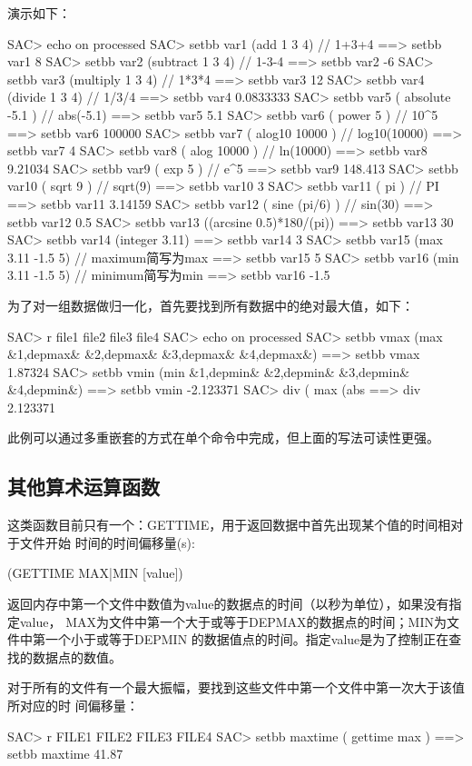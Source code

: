 演示如下：
\begin{SACCode}
SAC> echo on processed
SAC> setbb var1 (add 1 3 4)         // 1+3+4
 ==>  setbb var1 8
SAC> setbb var2 (subtract 1 3 4)    // 1-3-4
 ==>  setbb var2 -6
SAC> setbb var3 (multiply 1 3 4)    // 1*3*4
 ==>  setbb var3 12
SAC> setbb var4 (divide 1 3 4)      // 1/3/4
 ==>  setbb var4 0.0833333
SAC> setbb var5 ( absolute -5.1 )   // abs(-5.1)
 ==>  setbb var5 5.1
SAC> setbb var6 ( power 5 )         // 10^5
 ==>  setbb var6 100000
SAC> setbb var7 ( alog10 10000 )    // log10(10000)
 ==>  setbb var7 4
SAC> setbb var8 ( alog 10000 )      // ln(10000)
 ==>  setbb var8 9.21034
SAC> setbb var9 ( exp 5 )           // e^5
 ==>  setbb var9 148.413
SAC> setbb var10 ( sqrt 9 )         // sqrt(9)
 ==>  setbb var10 3
SAC> setbb var11 ( pi )             // PI
 ==>  setbb var11 3.14159
 SAC> setbb var12 ( sine (pi/6) )   // sin(30)
 ==>  setbb var12 0.5
SAC> setbb var13 ((arcsine 0.5)*180/(pi))
 ==>  setbb var13 30
SAC> setbb var14 (integer 3.11)
 ==>  setbb var14 3
SAC> setbb var15 (max 3.11 -1.5 5)  // maximum简写为max
 ==>  setbb var15 5
SAC> setbb var16 (min 3.11 -1.5 5)  // minimum简写为min
 ==>  setbb var16 -1.5
\end{SACCode}

为了对一组数据做归一化，首先要找到所有数据中的绝对最大值，如下：
\begin{SACCode}
SAC> r file1 file2 file3 file4
SAC> echo on processed
SAC> setbb vmax (max &1,depmax& &2,depmax& &3,depmax& &4,depmax&)
 ==> setbb vmax 1.87324
SAC> setbb vmin (min &1,depmin& &2,depmin& &3,depmin& &4,depmin&)
 ==> setbb vmin -2.123371
SAC> div ( max (abs %
 ==>  div 2.123371 
\end{SACCode}
此例可以通过多重嵌套的方式在单个命令中完成，但上面的写法可读性更强。

\subsection{其他算术运算函数}
这类函数目前只有一个：GETTIME，用于返回数据中首先出现某个值的时间相对于文件开始
时间的时间偏移量(s):
\begin{SACCode}
   (GETTIME MAX|MIN [value])
\end{SACCode}
返回内存中第一个文件中数值为value的数据点的时间（以秒为单位），如果没有指定value，
MAX为文件中第一个大于或等于DEPMAX的数据点的时间；MIN为文件中第一个小于或等于DEPMIN
的数据值点的时间。指定value是为了控制正在查找的数据点的数值。

对于所有的文件有一个最大振幅，要找到这些文件中第一个文件中第一次大于该值所对应的时
间偏移量：
\begin{SACCode}
SAC> r FILE1 FILE2 FILE3 FILE4
SAC> setbb maxtime ( gettime max )
 ==> setbb maxtime 41.87
\end{SACCode}


